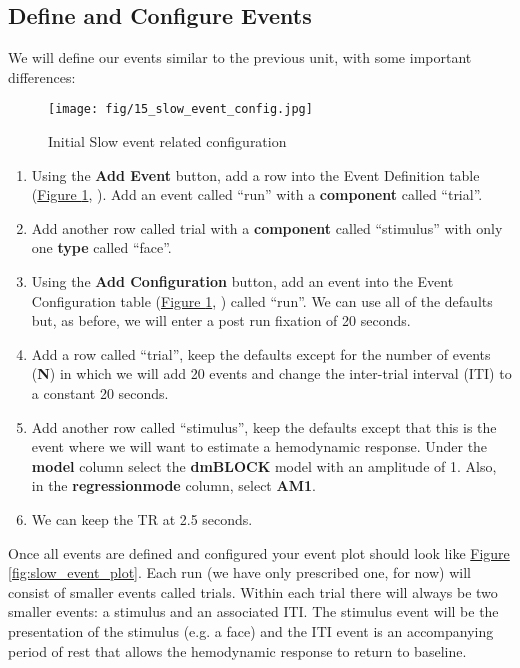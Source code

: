 \documentclass[10pt]{article}
\newcommand*\circled[1]{\tikz[baseline=(char.base)]{
            \node[shape=circle,draw,inner sep=.5pt] (char) {#1};}}
\begin{document}
	\subsection{Define and Configure Events}
	\label{subsec:u4define}
		We will define our events similar to the previous unit, with some important differences:
		\begin{figure}[ht]
			\centering
			\texttt{[image: fig/15\_slow\_event\_config.jpg]}
			\caption{Initial Slow event related configuration}
			\label{fig:slow_event_config}
		\end{figure}
		\begin{enumerate}
			\item Using the \textbf{Add Event} button, add a row into the Event Definition table (\hyperref[fig:slow_event_config]{Figure \ref{fig:slow_event_config}}, \circled{1}). Add an event called ``run'' with a \textbf{component} called ``trial''.
			\item Add another row called trial with a \textbf{component} called ``stimulus'' with only one \textbf{type} called ``face''.
			\item Using the \textbf{Add Configuration} button, add an event into the Event Configuration table (\hyperref[fig:slow_event_config]{Figure \ref{fig:slow_event_config}}, \circled{2}) called ``run''.
			We can use all of the defaults but, as before, we will enter a post run fixation of 20 seconds.
			\item Add a row called ``trial'', keep the defaults except for the number of events (\textbf{N}) in which we will add 20 events and change the inter-trial interval (ITI) to a constant 20 seconds.
			\item Add another row called ``stimulus'', keep the defaults except that this is the event where we will want to estimate a hemodynamic response.
			Under the \textbf{model} column select the \textbf{dmBLOCK} model with an amplitude of 1.
			Also, in the \textbf{regression\textunderscore mode} column, select \textbf{AM1}.
			\item We can keep the TR at 2.5 seconds.
		\end{enumerate}
			Once all events are defined and configured your event plot should look like \hyperref[fig:slow_event_plot]{Figure \ref{fig:slow_event_plot}}.
			Each run (we have only prescribed one, for now) will consist of smaller events called trials.
			Within each trial there will always be two smaller events: a stimulus and an associated ITI.
			The stimulus event will be the presentation of the stimulus (e.g. a face) and the ITI event is an accompanying period of rest that allows the hemodynamic response to return to baseline.
\end{document}
